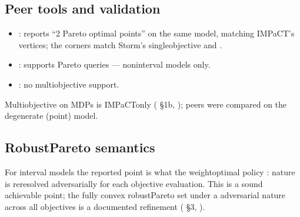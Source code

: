 \documentclass[a4paper,10pt,english]{sphinxmanual}
\begin{document}
\subsection{Peer tools and validation}
\label{\detokenize{manual/multiobjective:peer-tools-and-validation}}\begin{itemize}
\item {} 
\sphinxAtStartPar
{}:  reports “2 Pareto optimal points” on
the same model, matching IMPaCT’s vertices; the corners match Storm’s
single\sphinxhyphen{}objective  and .

\item {} 
\sphinxAtStartPar
{}: supports  Pareto queries — non\sphinxhyphen{}interval models only.

\item {} 
\sphinxAtStartPar
{}: no multi\sphinxhyphen{}objective support.

\end{itemize}

\sphinxAtStartPar
Multi\sphinxhyphen{}objective on  MDPs is IMPaCT\sphinxhyphen{}only ( \S{}1b,
); peers were compared on the degenerate (point) model.


\subsection{Robust\sphinxhyphen{}Pareto semantics}
\label{\detokenize{manual/multiobjective:robust-pareto-semantics}}
\sphinxAtStartPar
For interval models the reported point is what the weight\sphinxhyphen{}optimal policy : nature is re\sphinxhyphen{}resolved adversarially for each objective
evaluation. This is a sound achievable point; the fully convex robust\sphinxhyphen{}Pareto set under
a  adversarial nature across all objectives is a documented refinement
( \S{}3, ).
\end{document}
